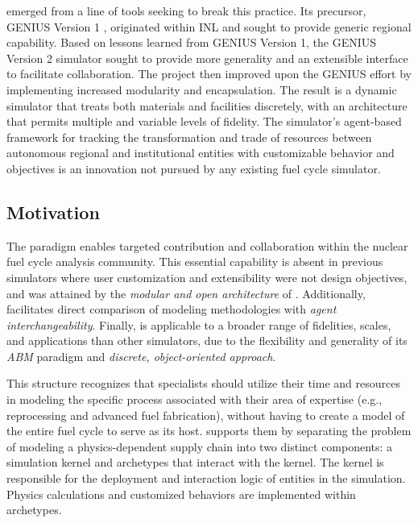 \Cyclus emerged from a line of tools seeking to break this practice.  Its
precursor,
\gls{GENIUS} Version 1 \cite{dunzik-gougar_global_2007,jain_transitioning_2006},
originated within \gls{INL} and sought to provide generic regional capability.
Based on lessons learned from \gls{GENIUS} Version 1, the \gls{GENIUS} Version
2 \cite{oliver_studying_2009,huff_geniusv2_2009} simulator sought to provide more
generality and an extensible interface to facilitate collaboration.  The
\Cyclus project then improved upon the \gls{GENIUS} effort by
implementing increased modularity and encapsulation.  The result is a dynamic
simulator that treats both materials and facilities discretely, with an
architecture that permits multiple and variable levels of fidelity. The
simulator's agent-based framework for tracking the transformation and trade of
resources between autonomous regional and institutional entities with
customizable behavior and objectives is an innovation not pursued by any
existing fuel cycle simulator.


\subsection{Motivation}

The \Cyclus paradigm enables targeted contribution and collaboration within the
nuclear fuel cycle analysis community. This essential capability is absent in
previous simulators where user customization and extensibility were not design
objectives, and was attained by the \emph{modular and open architecture} of
\Cyclus.  Additionally, \Cyclus facilitates direct comparison of modeling
methodologies with \emph{agent interchangeability}.  Finally, \Cyclus is
applicable to a broader range of fidelities, scales, and applications than
other simulators, due to the flexibility and generality of its
\emph{\gls{ABM}} paradigm and \emph{discrete, object-oriented approach}.

This structure recognizes that specialists should utilize their time and
resources in modeling the specific process associated with their area of
expertise (e.g., reprocessing and advanced fuel fabrication), without having to
create a model of the entire fuel cycle to serve as its host.  \Cyclus supports
them by separating the problem of modeling a physics-dependent supply chain
into two distinct components: a simulation kernel and archetypes that interact
with the kernel. The kernel is responsible for the deployment and interaction
logic of entities in the simulation.  Physics calculations and customized
behaviors are implemented within archetypes.

